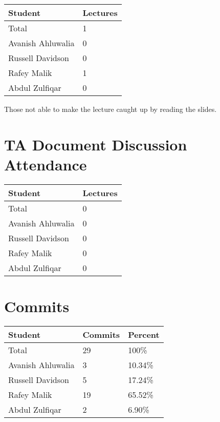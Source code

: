 \documentclass{article}
\begin{document}
\begin{table}[H]
\centering
\begin{tabular}{ll}
\toprule
\textbf{Student} & \textbf{Lectures}\\
\midrule
Total & 1\\
Avanish Ahluwalia & 0\\
Russell Davidson & 0\\
Rafey Malik & 1\\
Abdul Zulfiqar & 0\\
\bottomrule
\end{tabular}
\end{table}

Those not able to make the lecture caught up by reading the slides.

\section{TA Document Discussion Attendance}

\begin{table}[H]
\centering
\begin{tabular}{ll}
\toprule
\textbf{Student} & \textbf{Lectures}\\
\midrule
Total & 0\\
Avanish Ahluwalia & 0\\
Russell Davidson & 0\\
Rafey Malik & 0\\
Abdul Zulfiqar & 0\\
\bottomrule
\end{tabular}
\end{table}

\section{Commits}

\begin{table}[H]
\centering
\begin{tabular}{lll}
\toprule
\textbf{Student} & \textbf{Commits} & \textbf{Percent}\\
\midrule
Total & 29 & 100\% \\
Avanish Ahluwalia & 3 & 10.34\%\\
Russell Davidson & 5 & 17.24\%\\
Rafey Malik & 19 & 65.52\%\\
Abdul Zulfiqar & 2 & 6.90\%\\
\bottomrule
\end{tabular}
\end{table}
\end{document}
